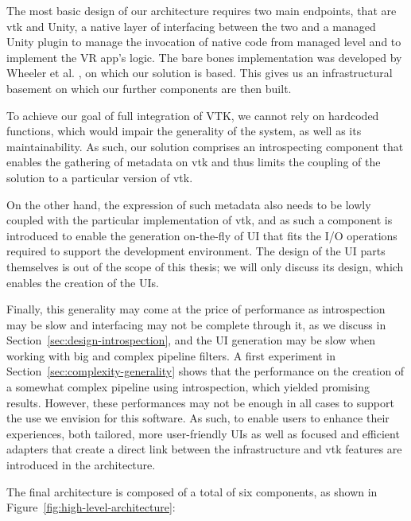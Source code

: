 The most basic design of our architecture requires two main endpoints, that are \acrshort{vtk} and Unity, a native layer of interfacing between the two and a managed Unity plugin to manage the invocation of native code from managed level and to implement the VR app's logic. The bare bones implementation was developed by Wheeler et al. \cite{wheeler_virtual_2018}, on which our solution is based. This gives us an infrastructural basement on which our further components are then built.

To achieve our goal of full integration of VTK, we cannot rely on hardcoded functions, which would impair the generality of the system, as well as its maintainability. As such, our solution comprises an introspecting component that enables the gathering of metadata on \acrshort{vtk} and thus limits the coupling of the solution to a particular version of \acrshort{vtk}.

On the other hand, the expression of such metadata also needs to be lowly coupled with the particular implementation of \acrshort{vtk}, and as such a component is introduced to enable the generation on-the-fly of UI that fits the I/O operations required to support the development environment. The design of the UI parts themselves is out of the scope of this thesis; we will only discuss its design, which enables the creation of the UIs.

Finally, this generality may come at the price of performance as introspection may be slow and interfacing may not be complete through it, as we discuss in Section~\ref{sec:design-introspection}, and the UI generation may be slow when working with big and complex pipeline filters. A first experiment in Section~\ref{sec:complexity-generality} shows that the performance on the creation of a somewhat complex pipeline using introspection, which yielded promising results. However, these performances may not be enough in all cases to support the use we envision for this software. As such, to enable users to enhance their experiences, both  tailored, more user-friendly UIs as well as focused and efficient adapters that create a direct link between the infrastructure and \acrshort{vtk} features are introduced in the architecture.

The final architecture is composed of a total of six components, as shown in Figure~\ref{fig:high-level-architecture}:

